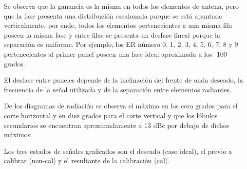 Se observa que la ganancia es la misma en todos los elementos de antena, pero que la fase presenta una distribución escalonada
porque se está apuntado verticalmente, por ende, todos los elementos pertenecientes a una misma fila poseen la misma fase y entre
filas se presenta un desfase lineal porque la separación es uniforme. Por ejemplo, los ER número 0, 1, 2, 3, 4, 5, 6, 7, 8 y 9
pertenecientes al primer panel poseen una fase ideal aproximada a los -100 grados.

El desfase entre paneles depende de la inclinación del frente de onda deseado, la frecuencia de la señal utilizada y de la
separación entre elementos radiantes.

De los diagramas de radiación se observa el máximo en los cero grados para el corte horizontal y en diez grados para el corte
vertical y que los lóbulos secundarios se encuentran aproximadamente a 13 dBc por debajo de dichos máximos.

Los tres estados de señales graficados son el deseado (caso ideal), el previo a calibrar (non-cal) y el resultante de la
calibración (cal).

